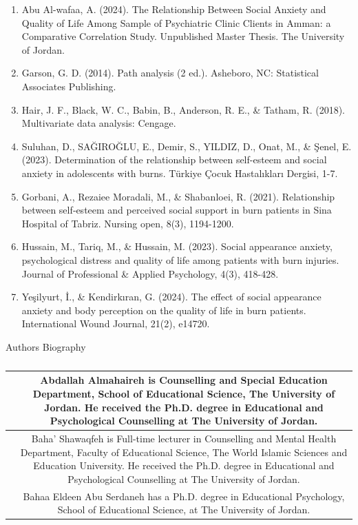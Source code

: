 \documentclass[10pt]{NSP1}
\begin{document}
\begin{enumerate}
  \item Abu Al-wafaa, A. (2024). The Relationship Between Social Anxiety and Quality of Life Among Sample of Psychiatric Clinic Clients in Amman: a Comparative Correlation Study. Unpublished Master Thesis. The University of Jordan.
  \item Garson, G. D. (2014). Path analysis (2 ed.). Asheboro, NC: Statistical Associates Publishing.
  \item Hair, J. F., Black, W. C., Babin, B., Anderson, R. E., \& Tatham, R. (2018). Multivariate data analysis: Cengage.
  \item Suluhan, D., SAĞIROĞLU, E., Demir, S., YILDIZ, D., Onat, M., \& Şenel, E. (2023). Determination of the relationship between self-esteem and social anxiety in adolescents with burns. Türkiye Çocuk Hastalıkları Dergisi, 1-7.
  \item Gorbani, A., Rezaiee Moradali, M., \& Shabanloei, R. (2021). Relationship between self‐esteem and perceived social support in burn patients in Sina Hospital of Tabriz. Nursing open, 8(3), 1194-1200.
  \item Hussain, M., Tariq, M., \& Hussain, M. (2023). Social appearance anxiety, psychological distress and quality of life among patients with burn injuries. Journal of Professional \& Applied Psychology, 4(3), 418-428.
  \item Yeşilyurt, İ., \& Kendirkıran, G. (2024). The effect of social appearance anxiety and body perception on the quality of life in burn patients. International Wound Journal, 21(2), e14720.
\end{enumerate}

Authors Biography

\begin{table}[htbp]
\centering
\begin{tabular}{cc}
\hline
 & Abdallah Almahaireh is Counselling and Special Education Department, School of Educational Science, The University of Jordan. He received the Ph.D. degree in Educational and Psychological Counselling at The University of Jordan. \\
\hline
 & Baha' Shawaqfeh is Full-time lecturer in Counselling and Mental Health Department, Faculty of Educational Science, The World Islamic Sciences and Education University. He received the Ph.D. degree in Educational and Psychological Counselling at The University of Jordan. \\
 & Bahaa Eldeen Abu Serdaneh has a Ph.D. degree in Educational Psychology, School of Educational Science, at The University of Jordan. \\
\hline
\end{tabular}
\caption{}

\end{table}
\end{document}
